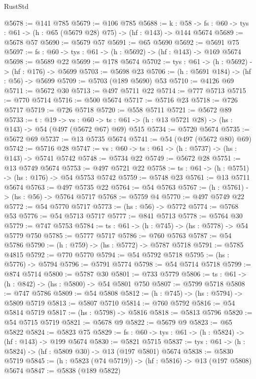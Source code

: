 \begin{lexlean}{RustStd}
\begin{coremodule}
@5678 := @141 @785
@5679 := @106 @785
@5688 := {k : @58} ->
  {fs : @60} -> {tys : @61} -> (h : @65 (@5679 @28) @75) -> (hf : @143) -> @144 @5674
@5689 := @5678 @57
@5690 := @5679 @57
@5691 := @65 @5690
@5692 := @5691 @75
@5697 := {fs : @60} -> {tys : @61} -> (h : @5692) -> (hf : @143) -> @169 @5674
@5698 := @5689 @22
@5699 := @178 @5674
@5702 := {tys : @61} -> (h : @5692) -> (hf : @176) -> @5699
@5703 := @5698 @23
@5706 := (h : @5691 @184) -> (hf : @56) -> @5699
@5709 := @5703 (@189 @5690) @53
@5710 := @4126 @69
@5711 := @5672 @30
@5713 := @497 @5711 @22
@5714 := @777 @5713
@5715 := @770 @5714
@5716 := @500 @5674
@5717 := @5716 @23
@5718 := @726 @5717
@5719 := @726 @5718
@5720 := @558 @5711
@5721 := @5672 @89
@5733 := {t : @19} ->
  {vs : @60} -> {ts : @61} -> (h : @13 @5721 @28) -> (hs : @143) -> @54 (@497 (@5672 @67) @69) @515
@5734 := @5720 @5674
@5735 := @5672 @69
@5737 := @13 @5735 @5674
@5741 := @54 (@497 (@5672 @80) @69)
@5742 := @5716 @28
@5747 := {vs : @60} -> {ts : @61} -> (h : @5737) -> (hs : @143) -> @5741 @5742
@5748 := @5734 @22
@5749 := @5672 @28
@5751 := @13 @5749 @5674
@5753 := @497 @5721 @22
@5758 := {ts : @61} -> (h : @5751) -> (hs : @176) -> @54 @5753 @5742
@5759 := @5748 @23
@5761 := @13 @5711 @5674
@5763 := @497 @5735 @22
@5764 := @54 @5763
@5767 := (h : @5761) -> (hs : @56) -> @5764 @5717
@5768 := @5759 @4
@5770 := @497 @5749 @22
@5772 := @54 @5770 @5717
@5773 := (hs : @56) -> @5772
@5774 := @5768 @53
@5776 := @54 @5713 @5717
@5777 := @841 @5713
@5778 := @5764 @30
@5779 := @747 @5753
@5784 := {ts : @61} -> (h : @745) -> (hs : @5778) -> @54 @5779 @750
@5785 := @5777 @5717
@5786 := @760 @5763
@5787 := @54 @5786
@5790 := (h : @759) -> (hs : @5772) -> @5787 @5718
@5791 := @5785 @4815
@5792 := @770 @5770
@5794 := @54 @5792 @5718
@5795 := (hs : @5776) -> @5794
@5796 := @5791 @5774
@5798 := @54 @5714 @5718
@5799 := @874 @5714
@5800 := @5787 @30
@5801 := @733 @5779
@5806 := {ts : @61} -> (h : @842) -> (hs : @5800) -> @54 @5801 @750
@5807 := @5799 @5718
@5808 := @747 @5786
@5809 := @54 @5808
@5812 := (h : @745) -> (hs : @5794) -> @5809 @5719
@5813 := @5807 @5710
@5814 := @760 @5792
@5816 := @54 @5814 @5719
@5817 := (hs : @5798) -> @5816
@5818 := @5813 @5796
@5820 := @54 @5715 @5719
@5821 := @5678 @9
@5822 := @5679 @9
@5823 := @65 @5822
@5824 := @5823 @75
@5829 := {fs : @60} -> {tys : @61} -> (h : @5824) -> (hf : @143) -> @199 @5674
@5830 := @5821 @5715
@5837 := {tys : @61} -> (h : @5824) -> (hf : @5809 @30) -> @13 (@197 @5801) @5674
@5838 := @5830 @5719
@5845 := (h : @5823 (@74 @5719)) -> (hf : @5816) -> @13 (@197 @5808) @5674
@5847 := @5838 (@189 @5822)

\end{coremodule}
\end{lexlean}

